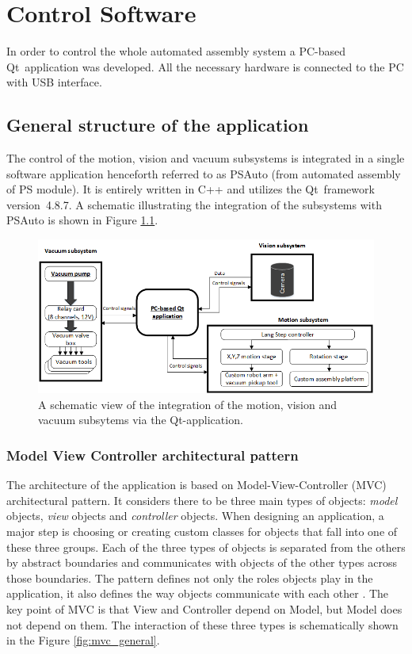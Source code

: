 \chapter{Control Software}

In order to control the whole automated assembly system a PC-based Qt~application was developed. All the necessary hardware is connected to the PC with USB interface.

\section{General structure of the application}

The control of the motion, vision and vacuum subsystems is integrated in a single software application henceforth referred to as PSAuto (from automated assembly of PS module). It is entirely written in C++ and utilizes the Qt~framework version~4.8.7. A schematic illustrating the integration of the subsystems with PSAuto is shown in Figure \ref{fig:general_app_structure}.

\begin{figure}[ht]\centering
\includegraphics[width=1\linewidth]{Data/Control_Software/Whole_system_diagram_(English).png}
\caption{A schematic view of the integration of the motion, vision and vacuum subsytems via the Qt-application.}
\label{fig:general_app_structure}
\end{figure}



\subsection{Model View Controller architectural pattern}

The architecture of the application is based on Model-View-Controller (MVC) architectural pattern. It considers there to be three main types of objects: \emph{model} objects, \emph{view} objects and \emph{controller} objects. When designing an application, a major step is choosing or creating custom classes for objects that fall into one of these three groups. Each of the three types of objects is separated from the others by abstract boundaries and communicates with objects of the other types across those boundaries. The pattern defines not only the roles objects play in the application, it also defines the way objects communicate with each other \cite{apple_MVC}. The key point of MVC is that View and Controller depend on Model, but Model does not depend on them. The  interaction of these three types is schematically shown in the Figure \ref{fig:mvc_general}.

